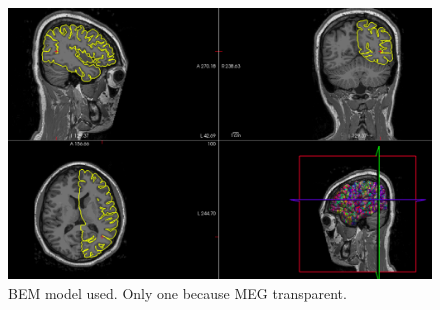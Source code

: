 \begin{figure}[ht]
    \centering
    \includegraphics[width=15cm]{images_report/source/BEM_model_freeview_cropped.png}
    \caption[Segemntentation results visualized on Freeview.]%
    {BEM model used. Only one because MEG transparent.}
    \label{BEM_model_freeview_cropped}
\end{figure}

